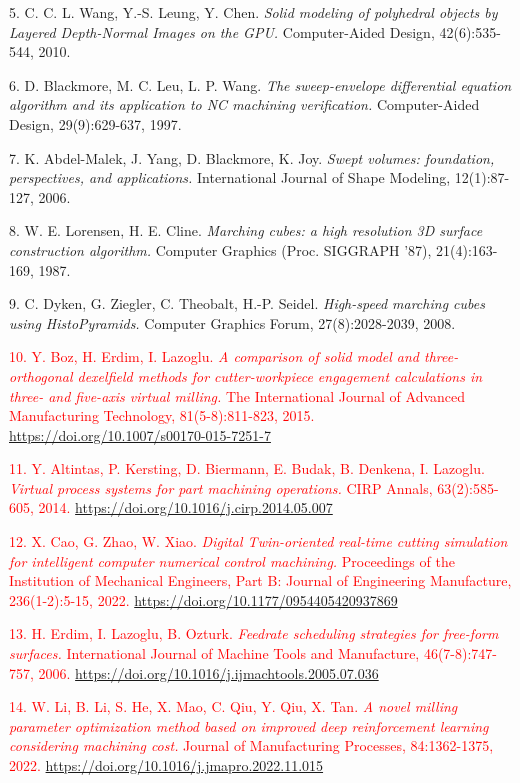 \documentclass[
]{article}
\begin{document}
5. C. C. L. Wang, Y.-S. Leung, Y. Chen. \emph{Solid modeling of
polyhedral objects by Layered Depth-Normal Images on the GPU.}
Computer-Aided Design, 42(6):535-544, 2010.

6. D. Blackmore, M. C. Leu, L. P. Wang. \emph{The sweep-envelope
differential equation algorithm and its application to NC machining
verification.} Computer-Aided Design, 29(9):629-637, 1997.

7. K. Abdel-Malek, J. Yang, D. Blackmore, K. Joy. \emph{Swept volumes:
foundation, perspectives, and applications.} International Journal of
Shape Modeling, 12(1):87-127, 2006.

8. W. E. Lorensen, H. E. Cline. \emph{Marching cubes: a high resolution
3D surface construction algorithm.} Computer Graphics (Proc. SIGGRAPH
'87), 21(4):163-169, 1987.

9. C. Dyken, G. Ziegler, C. Theobalt, H.-P. Seidel. \emph{High-speed
marching cubes using HistoPyramids.} Computer Graphics Forum,
27(8):2028-2039, 2008.

\textcolor{red}{10. Y. Boz, H. Erdim, I. Lazoglu. \emph{A comparison of solid model and
three-orthogonal dexelfield methods for cutter-workpiece engagement
calculations in three- and five-axis virtual milling.} The International
Journal of Advanced Manufacturing Technology, 81(5-8):811-823, 2015.
\url{https://doi.org/10.1007/s00170-015-7251-7}}

\textcolor{red}{11. Y. Altintas, P. Kersting, D. Biermann, E. Budak, B. Denkena, I.
Lazoglu. \emph{Virtual process systems for part machining operations.}
CIRP Annals, 63(2):585-605, 2014.
\url{https://doi.org/10.1016/j.cirp.2014.05.007}}

\textcolor{red}{12. X. Cao, G. Zhao, W. Xiao. \emph{Digital Twin-oriented real-time
cutting simulation for intelligent computer numerical control
machining.} Proceedings of the Institution of Mechanical Engineers, Part
B: Journal of Engineering Manufacture, 236(1-2):5-15, 2022.
\url{https://doi.org/10.1177/0954405420937869}}

\textcolor{red}{13. H. Erdim, I. Lazoglu, B. Ozturk. \emph{Feedrate scheduling
strategies for free-form surfaces.} International Journal of Machine
Tools and Manufacture, 46(7-8):747-757, 2006.
\url{https://doi.org/10.1016/j.ijmachtools.2005.07.036}}

\textcolor{red}{14. W. Li, B. Li, S. He, X. Mao, C. Qiu, Y. Qiu, X. Tan. \emph{A novel
milling parameter optimization method based on improved deep
reinforcement learning considering machining cost.} Journal of
Manufacturing Processes, 84:1362-1375, 2022.
\url{https://doi.org/10.1016/j.jmapro.2022.11.015}}
\end{document}
